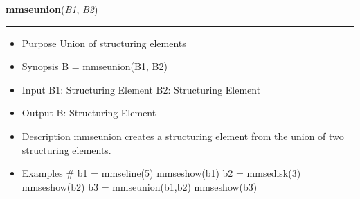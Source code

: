     \label{multireg:num_pymorph:mmseunion}
    \vspace{0.5ex}

    \begin{boxedminipage}{\textwidth}

    \raggedright \textbf{mmseunion}(\textit{B1}, \textit{B2})

    \vspace{-1.5ex}

    \rule{\textwidth}{0.5\fboxrule}
    \begin{itemize}
    \setlength{\parskip}{0.6ex}
      \item Purpose Union of structuring elements

      \item Synopsis B = mmseunion(B1, B2)

      \item Input B1: Structuring Element B2: Structuring Element

      \item Output B: Structuring Element

      \item Description mmseunion creates a structuring element from the 
        union of two structuring elements.

      \item Examples \# b1 = mmseline(5) mmseshow(b1) b2 = mmsedisk(3) 
        mmseshow(b2) b3 = mmseunion(b1,b2) mmseshow(b3)

    \end{itemize}

    \vspace{1ex}

    \end{boxedminipage}

    \label{multireg:num_pymorph:mmshow}
    \vspace{0.5ex}

